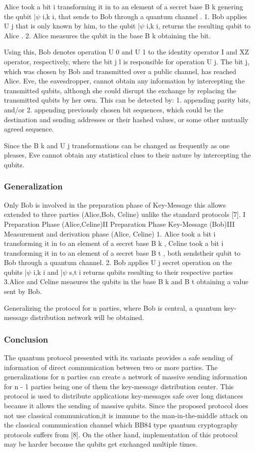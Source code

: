 Alice took a bit i transforming it in to an element of a secret base B k genering the qubit |$\psi$ i,k i, that sends to Bob through a quantum channel .
1. Bob applies U j that is only known by him, to the qubit |$\psi$ i,k i, returns the resulting qubit to Alice .
2. Alice measures the qubit in the base B k obtaining the bit.

Using this, Bob denotes operation U 0 and U 1 to the identity operator I and XZ operator, respectively, where the bit j l is responsible for operation U j. The bit j, which was chosen by Bob and transmitted over a public channel, has reached Alice. Eve, the eavesdropper, cannot obtain any information by intercepting the transmitted qubits, although she could disrupt the exchange by replacing the transmitted qubits by her own. This can be detected by:
1. appending parity bits, and/or
2. appending previously chosen bit sequences, which could be the destination and sending addresses or their hashed values, or some other mutually agreed sequence.

Since the B k and U j transformations can be changed as frequently as one pleases, Eve cannot obtain any statistical clues to their nature by intercepting the qubits.

\subsubsection{Generalization}
Only Bob is involved in the preparation phase of Key-Message this allows extended to three parties (Alice,Bob, Celine) unlike the standard protocols [7]. I Preparation Phase (Alice,Celine)II Preparation Phase Key-Message (Bob)III Measurement and derivation phase (Alice, Celine)
1. Alice took a bit i transforming it in to an element of a secret base B k , Celine took a bit i transforming it in to an element of a secret base B t , both sendstheir qubit to Bob through a quantum channel.
2. Bob applies U j secret operation on the qubits |$\psi$ i,k i and |$\psi$ s,t i returns qubits resulting to their respective parties
3.Alice and Celine measures the qubits in the base B k and B t obtaining a value sent by Bob.

Generalizing the protocol for n parties, where Bob is central, a quantum key-message distribution network will be obtained.

\subsubsection{Conclusion}
The quantum protocol presented with its variants provides a safe sending of information of direct communication between two or more parties. The generalizations for n parties can create a network of massive sending information for n - 1 parties being one of them the key-message distribution center. This protocol is used to distribute applications key-messages safe over long distances because it allows the sending of massive qubits. Since the proposed protocol does not use classical communication,it is immune to the man-in-the-middle attack on the classical communication channel which BB84 type quantum cryptography protocols suffers from [8]. On the other hand, implementation of this protocol may be harder because the qubits get exchanged multiple times.


